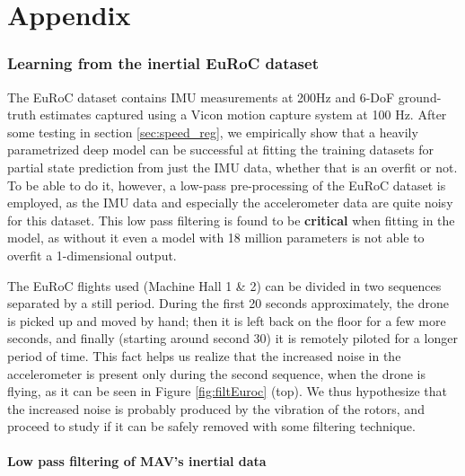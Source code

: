 \chapter{Appendix}\label{chap:appendix}

\subsection{Learning from the inertial EuRoC dataset}\label{sec:euroc_filtering}

The EuRoC dataset \cite{Burri25012016} contains IMU measurements at 200Hz and 6-DoF ground-truth estimates captured using a Vicon motion capture system at 100 Hz. 
After some testing in section \ref{sec:speed_reg}, we empirically show that a heavily parametrized deep model can be successful at fitting the training datasets for partial state prediction from just the IMU data, whether that is an overfit or not.
To be able to do it, however, a low-pass pre-processing of the EuRoC dataset is employed, as the IMU data and especially the accelerometer data are quite noisy for this dataset.
This low pass filtering is found to be \textbf{critical} when fitting in the model, as without it even a model with 18 million parameters is not able to overfit a 1-dimensional output.

The EuRoC flights used (Machine Hall 1 \& 2) can be divided in two sequences separated by a still period.
During the first 20 seconds approximately, the drone is picked up and moved by hand; then it is left back on the floor for a few more seconds, and finally (starting around second 30) it is remotely piloted for a longer period of time.
This fact helps us realize that the increased noise in the accelerometer is present only during the second sequence, when the drone is flying, as it can be seen in Figure \ref{fig:filtEuroc} (top).
We thus hypothesize that the increased noise is probably produced by the vibration of the rotors, and proceed to study if it can be safely removed with some filtering technique.

\subsubsection{Low pass filtering of MAV's inertial data}

